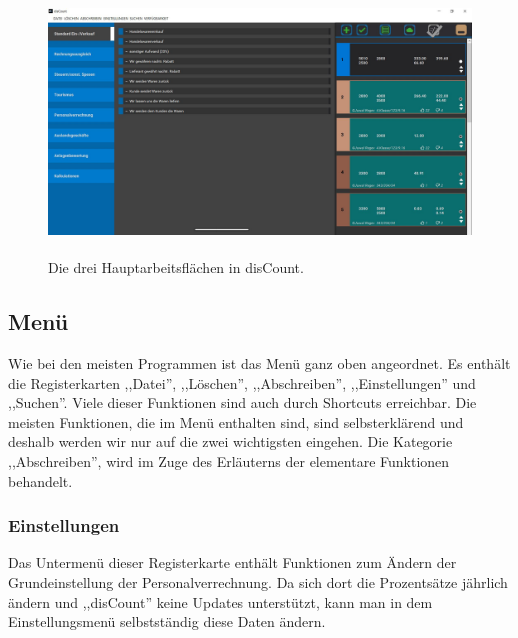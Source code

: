 \documentclass[12pt]{report}
\begin{document}
\begin{figure}[h]
	\centering
	\includegraphics[height=7cm]{images/hauptarbeitsflaechen}
	\caption[Hauptarbeitsflächen]{Die drei Hauptarbeitsflächen in disCount.}
\end{figure}


\subsection{Menü}
Wie bei den meisten Programmen ist das Menü ganz oben angeordnet. Es enthält die Registerkarten ,,Datei'', ,,Löschen'', ,,Abschreiben'', ,,Einstellungen'' und ,,Suchen''. Viele dieser Funktionen sind auch durch Shortcuts erreichbar. Die meisten Funktionen, die im Menü enthalten sind, sind selbsterklärend und deshalb werden wir nur auf die zwei wichtigsten eingehen. Die Kategorie ,,Abschreiben'', wird im Zuge des Erläuterns der elementare Funktionen behandelt.

\subsubsection{Einstellungen}
Das Untermenü dieser Registerkarte enthält Funktionen zum Ändern der Grundeinstellung der Personalverrechnung. Da sich dort die Prozentsätze jährlich ändern und ,,disCount'' keine Updates unterstützt, kann man in dem Einstellungsmenü selbstständig diese Daten ändern.
\end{document}
